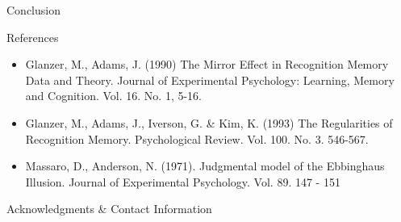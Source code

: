 \documentclass[final]{beamer}
\newlength{\onecolwid}
\begin{document}
\begin{frame}[t]
\begin{columns}[t]
\begin{column}{\onecolwid}
\begin{alertblock}{Conclusion}
\end{alertblock}


\begin{alertblock}{References}

\begin{itemize}
\item Glanzer, M., Adams, J. (1990) The Mirror Effect in Recognition Memory \: Data and Theory. Journal of Experimental Psychology: Learning, Memory and Cognition. Vol. 16. No. 1, 5-16.
\item Glanzer, M., Adams, J., Iverson, G. \& Kim, K. (1993) The Regularities of Recognition Memory. Psychological Review. Vol. 100. No. 3. 546-567.
\item Massaro, D., Anderson, N. (1971). Judgmental model of the Ebbinghaus Illusion. Journal of Experimental Psychology. Vol. 89. 147 - 151
\end{itemize}


\end{alertblock}



\begin{alertblock}{Acknowledgments \& Contact Information}


\end{alertblock}
\end{column}
\end{columns}
\end{frame}
\end{document}
